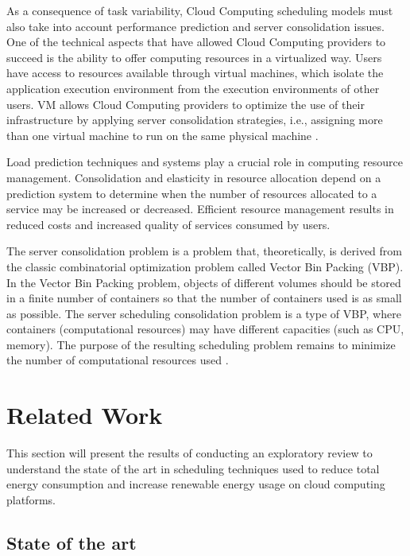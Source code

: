 \documentclass[12pt,a4paper]{article}
\begin{document}
As a consequence of task variability, Cloud Computing scheduling models must also take into account performance prediction and server consolidation issues. One of the technical aspects that have allowed Cloud Computing providers to succeed is the ability to offer computing resources in a virtualized way. Users have access to resources available through virtual machines, which isolate the application execution environment from the execution environments of other users. VM allows Cloud Computing providers to optimize the use of their infrastructure by applying server consolidation strategies, i.e., assigning more than one virtual machine to run on the same physical machine \citep{BKB07, Cla05, FERRETO20111027}.

Load prediction techniques and systems play a crucial role in computing resource management. Consolidation and elasticity in resource allocation depend on a prediction system to determine when the number of resources allocated to a service may be increased or decreased. Efficient resource management results in reduced costs and increased quality of services consumed by users.

The server consolidation problem is a problem that, theoretically, is derived from the classic combinatorial optimization problem called Vector Bin Packing (VBP). In the Vector Bin Packing problem, objects of different volumes should be stored in a finite number of containers so that the number of containers used is as small as possible. The server scheduling consolidation problem is a type of VBP, where containers (computational resources) may have different capacities (such as CPU, memory). The purpose of the resulting scheduling problem remains to minimize the number of computational resources used \citep{Cohen2011MultiorganizationSA,  Ramirez, Shen}.

\section{Related Work}

This section will present the results of conducting an exploratory review to understand the state of the art in scheduling techniques used to reduce total energy consumption and increase renewable energy usage on cloud computing platforms. 

\subsection{State of the art}
\end{document}
